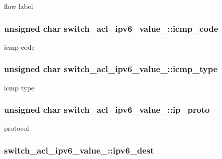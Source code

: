 flow label \hypertarget{unionswitch__acl__ipv6__value___ad670ffa0662f14d5438fa17f73aa1fa0}{
\subsubsection[{icmp\+\_\+code}]{\setlength{\rightskip}{0pt plus 5cm}unsigned char switch\+\_\+acl\+\_\+ipv6\+\_\+value\+\_\+\+::icmp\+\_\+code}}\label{unionswitch__acl__ipv6__value___ad670ffa0662f14d5438fa17f73aa1fa0}
icmp code \hypertarget{unionswitch__acl__ipv6__value___a14db1584e48870eb442df2649fed3ec4}{
\subsubsection[{icmp\+\_\+type}]{\setlength{\rightskip}{0pt plus 5cm}unsigned char switch\+\_\+acl\+\_\+ipv6\+\_\+value\+\_\+\+::icmp\+\_\+type}}\label{unionswitch__acl__ipv6__value___a14db1584e48870eb442df2649fed3ec4}
icmp type \hypertarget{unionswitch__acl__ipv6__value___a5f054e913836222089458105366598d4}{
\subsubsection[{ip\+\_\+proto}]{\setlength{\rightskip}{0pt plus 5cm}unsigned char switch\+\_\+acl\+\_\+ipv6\+\_\+value\+\_\+\+::ip\+\_\+proto}}\label{unionswitch__acl__ipv6__value___a5f054e913836222089458105366598d4}
protocol \hypertarget{unionswitch__acl__ipv6__value___a78ddaa4f3d8d7fd509aa47cab612b158}{
\subsubsection[{ipv6\+\_\+dest}]{ switch\+\_\+acl\+\_\+ipv6\+\_\+value\+\_\+\+::ipv6\+\_\+dest}}\label{unionswitch__acl__ipv6__value___a78ddaa4f3d8d7fd509aa47cab612b158}
